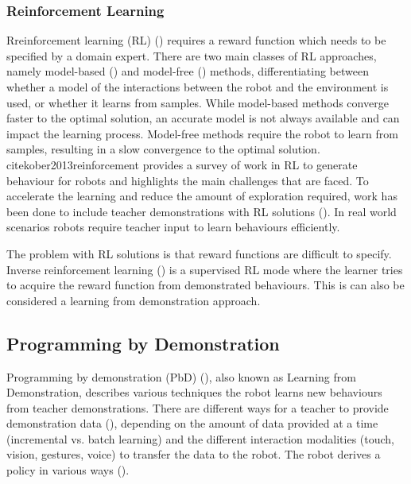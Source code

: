 \subsubsection{Reinforcement Learning}
Rreinforcement learning (RL) (\cite{sutton1998reinforcement,kaelbling1996reinforcement,gosavi2009reinforcement}) requires a reward function which needs to be specified by a domain expert.
There are two main classes of RL approaches, namely model-based (\cite{polydoros2017survey}) and model-free (\cite{kober2013reinforcement}) methods, differentiating between whether a model of the interactions between the robot and the environment is used, or whether it learns from samples.
While model-based methods converge faster to the optimal solution, an accurate model is not always available and can impact the learning process.
Model-free methods require the robot to learn from samples, resulting in a slow convergence to the optimal solution.
cite{kober2013reinforcement} provides a survey of work in RL to generate behaviour for robots and highlights the main challenges that are faced.
To accelerate the learning and reduce the amount of exploration required, work has been done to include teacher demonstrations with RL solutions (\cite{martinez2017relational,hester2017learning}).
In real world scenarios robots require teacher input to learn behaviours efficiently. 

The problem with RL solutions is that reward functions are difficult to specify.
Inverse reinforcement learning (\cite{abbeel2011inverse}) is a supervised RL mode where the learner tries to acquire the reward function from demonstrated behaviours.
This is can also be considered a learning from demonstration approach.

\subsection{Programming by Demonstration}
Programming by demonstration (PbD) (\cite{billard2008robot}), also known as Learning from Demonstration, describes various techniques the robot learns new behaviours from teacher demonstrations. 
There are different ways for a teacher to provide demonstration data (), depending on the amount of data provided at a time (incremental vs. batch learning) and the different interaction modalities (touch, vision, gestures, voice) to transfer the data to the robot. 
The robot derives a policy in various ways (). 

